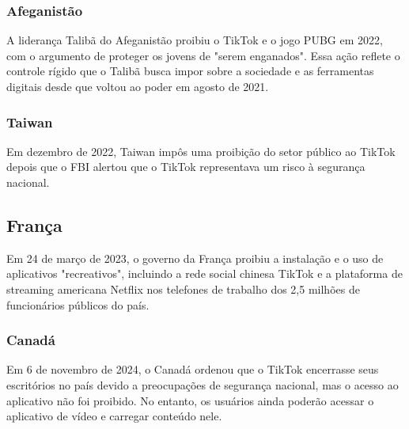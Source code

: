 \subsubsection{Afeganistão}

A liderança Talibã do Afeganistão proibiu o TikTok e o jogo PUBG em 2022, com o argumento de proteger os jovens de "serem enganados". Essa ação reflete o controle rígido que o Talibã busca impor sobre a sociedade e as ferramentas digitais desde que voltou ao poder em agosto de 2021.


\subsubsection{Taiwan}

Em dezembro de 2022, Taiwan impôs uma proibição do setor público ao TikTok depois que o FBI alertou que o TikTok representava um risco à segurança nacional.


\subsection{França}

Em 24 de março de 2023, o governo da França proibiu a instalação e o uso de aplicativos "recreativos", incluindo a rede social chinesa TikTok e a plataforma de streaming americana Netflix nos telefones de trabalho dos 2,5 milhões de funcionários públicos do país.


\subsubsection{Canadá}
Em 6 de novembro de 2024, o Canadá ordenou que o TikTok encerrasse seus escritórios no país devido a preocupações de segurança nacional, mas o acesso ao aplicativo não foi proibido. No entanto, os usuários ainda poderão acessar o aplicativo de vídeo e carregar conteúdo nele.
